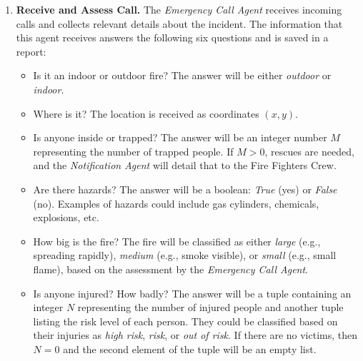 \begin{enumerate}

    \item \textbf{Receive and Assess Call.} 
    The \textit{Emergency Call Agent} receives incoming calls and collects relevant details
    about the incident. The information that this agent receives answers the following six questions and is saved
    in a report:
    \begin{itemize}
        \item Is it an indoor or outdoor fire? The answer will be either \textit{outdoor} or \textit{indoor}.
        \item Where is it? The location is received as coordinates \((x, y)\).
        \item Is anyone inside or trapped? The answer will be an integer number $M$ representing the number of trapped people. 
              If $M > 0$, rescues are needed, and the \textit{Notification Agent} will detail that to the Fire Fighters Crew.
        \item Are there hazards? The answer will be a boolean: \textit{True} (yes) or \textit{False} (no). Examples of hazards could include 
              gas cylinders, chemicals, explosions, etc.
        \item How big is the fire? The fire will be classified as either \textit{large} (e.g., spreading rapidly), \textit{medium} (e.g., smoke visible), 
              or \textit{small} (e.g., small flame), based on the assessment by the \textit{Emergency Call Agent}.
        \item Is anyone injured? How badly? The answer will be a tuple containing an integer $N$ representing the number of injured 
              people and another tuple listing the risk level of each person. They could be classified based on their injuries as \textit{high risk}, 
              \textit{risk}, or \textit{out of risk}. If there are no victims, then $N = 0$ and the second element of the tuple will be an empty list.
    \end{itemize}
    

\end{enumerate}
